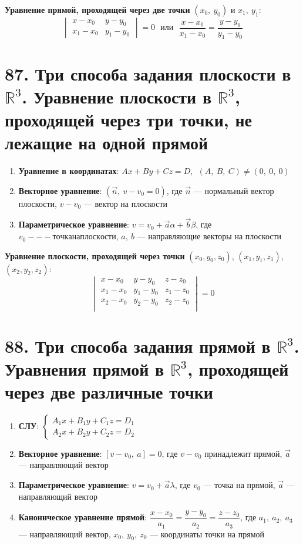 \documentclass[a4paper, 12pt]{article}
\newcommand{\R}{\mathbb{R}}
\begin{document}
\textbf{Уравнение прямой, проходящей через две точки} $(x_0,\ y_0)$ и $x_1,\ y_1$:
\[
\begin{vmatrix}
x - x_0 & y - y_0 \\
x_1 - x_0 & y_1 - y_0
\end{vmatrix} = 0
\ \ \ \text{или}\ \ \
\dfrac{x - x_0}{x_1 - x_0} = \dfrac{y - y_0}{y_1 - y_0}
\]

\section*{87. Три способа задания плоскости в $\R^3$. Уравнение плоскости в $\R^3$, проходящей через три точки, не лежащие на одной прямой}
\begin{enumerate}
    \itemsep0em
    \item \textbf{Уравнение в координатах}: $Ax + By + Cz = D,\ \ (A,\ B,\ C) \neq (0,\ 0,\ 0)$
    \item \textbf{Векторное уравнение}: $(\vec n,\ v - v_0 = 0)$, где $\vec n$ --- нормальный вектор плоскости, $v - v_0$ --- вектор на плоскости
    \item \textbf{Параметрическое уравнение}: $v = v_0 + \vec a\alpha + \vec b\beta$, где $v_0 --- точка на плоскости$, $a,\ b$ --- направляющие векторы на плоскости
\end{enumerate}

\textbf{Уравнение плоскости, проходящей через точки} $(x_0, y_0, z_0)$, $(x_1, y_1, z_1)$, $(x_2, y_2, z_2)$:
\[
\begin{vmatrix}
x - x_0 & y - y_0 & z - z_0 \\
x_1 - x_0 & y_1 - y_0 & z_1 - z_0 \\
x_2 - x_0 & y_2 - y_0 & z_2 - z_0 \\
\end{vmatrix} = 0
\]

\section*{88. Три способа задания прямой в $\R^3$. Уравнения прямой в $\R^3$, проходящей через две различные точки}
\begin{enumerate}
    \itemsep0em
    \item \textbf{СЛУ}: $
        \begin{cases*}
            A_1x + B_1y + C_1z = D_1 \\
            A_2x + B_2y + C_2z = D_2
        \end{cases*}
         $
    \item \textbf{Векторное уравнение}: $[v - v_0,\ a] = 0$, где $v - v_0$ принадлежит прямой, $\vec a$ --- направляющий вектор
    \item \textbf{Параметрическое уравнение}: $v = v_0 + \vec a\lambda$, где $v_0$ --- точка на прямой, $\vec a$ --- направляющий вектор
    \item \textbf{Каноническое уравнение прямой}: $\dfrac{x - x_0}{a_1} = \dfrac{y - y_0}{a_2} = \dfrac{z - z_0}{a_3}$, где $a_1,\ a_2,\ a_3$ --- направляющий вектор, $x_0,\ y_0,\ z_0$ --- координаты точки на прямой
\end{enumerate}
\end{document}
